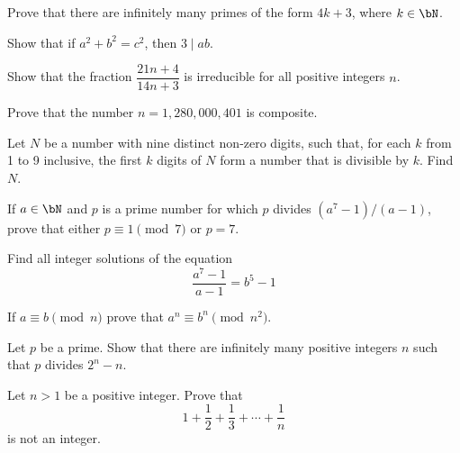 \documentclass[12pt]{article}
\begin{document}
        \begin{exercise}
            Prove that there are infinitely many primes of the form \(4k+3\), where \(k\in\bN\).
        \end{exercise}
    
        \begin{exercise}
            Show that if \(a^2+b^2=c^2\), then \(3\mid ab\).
        \end{exercise}
    
        \begin{exercise}
            Show that the fraction \(\dfrac{21n+4}{14n+3}\) is irreducible for all positive integers \(n\).
        \end{exercise}
    
        \begin{exercise}
            Prove that the number \(n=1,280,000,401\) is composite.
        \end{exercise}
    
        \begin{exercise}
            Let \(N\) be a number with nine distinct non-zero digits, such that, for each \(k\) from 1 to 9 inclusive, the first \(k\) digits of \(N\) form a number that is divisible by \(k\). 
            Find \(N\).
        \end{exercise}
        
        \begin{exercise}
            If $a\in \bN$ and $p$ is a prime number for which $p$ divides $(a^7-1)/(a-1)$, prove that either $p \equiv 1 \pmod{7}$ or $p=7$.
        \end{exercise}
        
        \begin{exercise}
            Find all integer solutions of the equation
            \[\frac{a^7-1}{a-1} = b^5-1\]
        \end{exercise}
        
        \begin{exercise}
            If $a\equiv b \pmod{n}$ prove that $a^n \equiv b^n \pmod{n^2}$.
        \end{exercise}
        
        \begin{exercise}
            Let $p$ be a prime. Show that there are infinitely many positive integers $n$ such that $p$ divides $2^n-n$.
        \end{exercise}
        
        \begin{exercise}
            Let $n>1$ be a positive integer. Prove that 
            \[1+\frac{1}{2}+\frac{1}{3}+\cdots + \frac{1}{n}\] is not an integer.
        \end{exercise}
\end{document}
